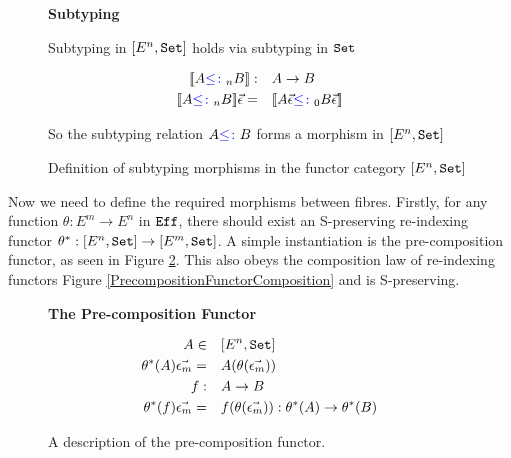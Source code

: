 \documentclass{Report}
\begin{document}
\begin{figure}
    \begin{framed}
        
\centering\textbf{Subtyping}


Subtyping in $[E^n, \texttt{Set}]$ holds via subtyping in $\texttt{Set}$

\begin{align*}
    {\bf [\![}A{\color{blue} \leq\colon}_n B{\bf ]\!]}:&\quad A\rightarrow B\\
    {\bf [\![}A{\color{blue} \leq\colon}_n B{\bf ]\!]}\vec{\epsilon}=&\quad {\bf [\![}A\vec{\epsilon}{\color{blue} \leq\colon}_0 B\vec{\epsilon}{\bf ]\!]}
\end{align*}

So the subtyping relation $A {\color{blue} \leq\colon} B$ forms a morphism in $[E^n, \texttt{Set}]$

    \end{framed}
    \caption{Definition of subtyping morphisms in the functor category $[E^n, \texttt{Set}]$}
    \label{HowToBuildSubtyping}
\end{figure}

Now we need to define the required morphisms between fibres. Firstly, for any function $\theta: E^m \rightarrow E^n$ in $\texttt{Eff}$, there should exist an S-preserving re-indexing functor $\theta^*: [E^n, \texttt{Set}] \rightarrow [E^m, \texttt{Set}]$. A simple instantiation is the pre-composition functor, as seen in Figure \ref{PrecompositionFunctor}. This also obeys the composition law of re-indexing functors Figure \ref{PrecompositionFunctorComposition} and is S-preserving.


\begin{figure}
    \begin{framed}
        \centering
        \textbf{The Pre-composition Functor}

        \begin{align*}
            A\in&\quad [E^n, \texttt{Set}]\\
            \theta^*(A) \vec{\epsilon_m} =&\quad  A(\theta(\vec{\epsilon_m}))\\
            f:&\quad A \rightarrow B\\
            \theta^*(f) \vec{\epsilon_m} =&\quad f(\theta(\vec{\epsilon_m})): \theta^*(A) \rightarrow \theta^*(B)\\
        \end{align*}
    \end{framed}
    \caption{A description of the pre-composition functor.}
    \label{PrecompositionFunctor}
\end{figure}
\end{document}
